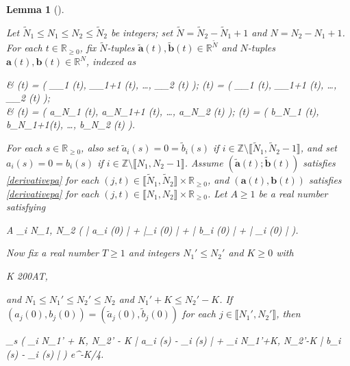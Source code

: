 \documentclass{amsart}
\numberwithin{equation}{section}
\newtheorem{lem}[thm]{Lemma}
\theoremstyle{remark}
\theoremstyle{definition}
\begin{document}
	
	\begin{lem}[{\cite[Proposition 4.5]{LC}}] 
	
	\label{a2p2}
	
		Let $\tilde{N}_1 \le N_1 \le N_2 \le \tilde{N}_2$ be integers; set $\tilde{N} = \tilde{N}_2 - \tilde{N}_1 + 1$ and $N = N_2 - N_1 + 1$. For each $t \in \mathbb{R}_{\ge 0}$, fix $\tilde{N}$-tuples $\tilde{\bm{a}}(t), \tilde{\bm{b}} (t) \in \mathbb{R}^{\tilde{N}}$ and $N$-tuples $\bm{a}(t), \bm{b}(t) \in \mathbb{R}^N$, indexed as 
		\begin{flalign*} 
			&  (t) = ( _{_1} (t), _{_1+1} (t), \ldots , _{_2} (t) ); \qquad {} (t) = ( _{_1} (t), _{_1+1} (t), \ldots , _{_2} (t) ); \\
			& (t) = ( a_{N_1} (t), a_{N_1+1} (t), \ldots , a_{N_2} (t) ); \qquad {}(t) = ( b_{N_1} (t), b_{N_1+1}(t), \ldots , b_{N_2} (t) ).
		\end{flalign*} 
		
		\noindent For each $s \in \mathbb{R}_{\ge 0}$, also set $\tilde{a}_i (s) = 0 = \tilde{b}_i (s)$ if $i \in \mathbb{Z} \setminus \llbracket \tilde{N}_1, \tilde{N}_2 - 1\rrbracket$, and set $a_i (s) = 0 = b_i (s)$ if $i \in \mathbb{Z} \setminus \llbracket N_1, N_2 - 1 \rrbracket$. Assume $( \tilde{\bm{a}} (t); \tilde{\bm{b}} (t) )$ satisfies \eqref{derivativepa} for each $(j, t) \in \llbracket \tilde{N}_1, \tilde{N}_2 \rrbracket \times \mathbb{R}_{\ge 0}$, and $( \bm{a}(t), \bm{b}(t) )$ satisfies \eqref{derivativepa} for each $(j, t) \in \llbracket N_1, N_2 \rrbracket \times \mathbb{R}_{\ge 0}$. Let $A \ge 1$ be a real number satisfying
		\begin{flalign*}
			A \ge \displaystyle\max_{i \in \llbracket N_1, N_2 \rrbracket} \big( | a_i (0) | + |_i (0) | +  | b_i (0) | + | _i (0) | \big).
		\end{flalign*}
		
		\noindent Now fix a real number $T \ge 1$ and integers $N_1' \le N_2'$ and $K \ge 0$ with
		\begin{flalign*} 
			K \ge 200AT,
		\end{flalign*} 
		
		\noindent and $N_1 \le N_1'  \le N_2' \le N_2$ and $N_1' + K \le N_2' - K$. If $(a_j (0), b_j (0)) = (\tilde{a}_j (0), \tilde{b}_j (0))$ for each $j \in \llbracket N_1', N_2'  \rrbracket$, then 
		\begin{flalign*}
			 \displaystyle\sup_{s \in [0, T]} \bigg( \displaystyle\max_{i \in \llbracket N_1' + K, N_2' - K \rrbracket} | a_i (s) - _i (s) | + \displaystyle\max_{i \in \llbracket N_1'+K, N_2'-K \rrbracket} | b_i (s) - _i (s) | \bigg) \le e^{-K/4}.
		\end{flalign*}
		
		
	\end{lem}
	
\end{document}

